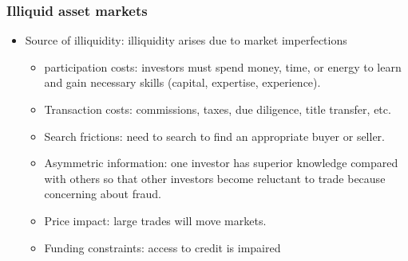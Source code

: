 \subsubsection{Illiquid asset markets}
\begin{itemize}
\item Source of illiquidity: illiquidity arises due to market imperfections

    \begin{itemize}
    \item participation costs: investors must spend money, time, or energy to learn and gain necessary skills (capital, expertise, experience).
    \item Transaction costs: commissions, taxes, due diligence, title transfer, etc.
    \item Search frictions: need to search to find an appropriate buyer or seller.
    \item Asymmetric information: one investor has superior knowledge compared with others so that other investors become reluctant to trade because concerning about fraud.
    \item Price impact: large trades will move markets.
    \item Funding constraints: access to credit is impaired
    \end{itemize}
    
\end{itemize}



